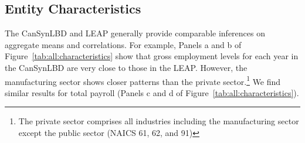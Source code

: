 
\newcommand{\CanTableNote}{$LEAP$ is the Longitudinal Employment Analysis Program and $CanSynLBD$ is the Canadian synthetic database based on LEAP. }

\subsection{Entity Characteristics}

The CanSynLBD and LEAP generally provide comparable inferences on aggregate means and correlations. For example, 
Panels a and b of Figure~\ref{tab:all:characteristics}
show that gross employment levels for each year in the CanSynLBD are very close to those in the LEAP. However, the manufacturing sector shows closer patterns than the private sector.\footnote{The private sector comprises all industries including the manufacturing sector except the public sector  (NAICS 61, 62, and 91)} We find similar results for total payroll (Panels c and d of Figure~\ref{tab:all:characteristics}).

